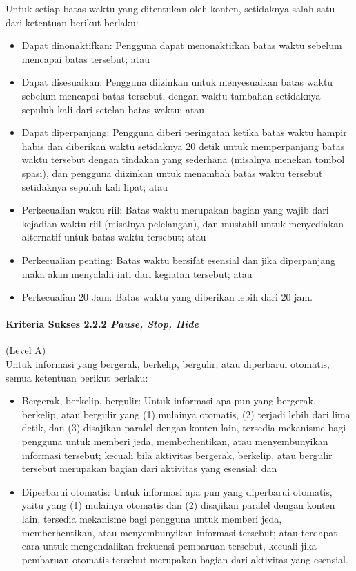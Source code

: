 Untuk setiap batas waktu yang ditentukan oleh konten, setidaknya salah satu dari ketentuan berikut berlaku:
\begin{itemize}
	\item Dapat dinonaktifkan: Pengguna dapat menonaktifkan batas waktu sebelum mencapai batas tersebut; atau
	\item Dapat disesuaikan: Pengguna diizinkan untuk menyesuaikan batas waktu sebelum mencapai batas tersebut, dengan waktu tambahan setidaknya sepuluh kali dari setelan batas waktu; atau
	\item Dapat diperpanjang: Pengguna diberi peringatan ketika batas waktu hampir habis dan diberikan waktu setidaknya 20 detik untuk memperpanjang batas waktu tersebut dengan tindakan yang sederhana (misalnya menekan tombol spasi), dan pengguna diizinkan untuk menambah batas waktu tersebut setidaknya sepuluh kali lipat; atau
	\item Perkecualian waktu riil: Batas waktu merupakan bagian yang wajib dari kejadian waktu riil (misalnya pelelangan), dan mustahil untuk menyediakan alternatif untuk batas waktu tersebut; atau
	\item Perkecualian penting: Batas waktu bersifat esensial dan jika diperpanjang maka akan menyalahi inti dari kegiatan tersebut; atau
	\item Perkecualian 20 Jam: Batas waktu yang diberikan lebih dari 20 jam.
\end{itemize}

\paragraph{Kriteria Sukses 2.2.2 \textit{Pause, Stop, Hide}}
\label{sec:kriteria_sukses_2.2.2}
(Level A)\\

Untuk informasi yang bergerak, berkelip, bergulir, atau diperbarui otomatis, semua ketentuan berikut berlaku:
\begin{itemize}
	\item Bergerak, berkelip, bergulir: Untuk informasi apa pun yang bergerak, berkelip, atau bergulir yang (1) mulainya otomatis, (2) terjadi lebih dari lima detik, dan (3) disajikan paralel dengan konten lain, tersedia mekanisme bagi pengguna untuk memberi jeda, memberhentikan, atau menyembunyikan informasi tersebut; kecuali bila aktivitas bergerak, berkelip, atau bergulir tersebut merupakan bagian dari aktivitas yang esensial; dan
	\item Diperbarui otomatis: Untuk informasi apa pun yang diperbarui otomatis, yaitu yang (1) mulainya otomatis dan (2) disajikan paralel dengan konten lain, tersedia mekanisme bagi pengguna untuk memberi jeda, memberhentikan, atau menyembunyikan informasi tersebut; atau terdapat cara untuk mengendalikan frekuensi pembaruan tersebut, kecuali jika pembaruan otomatis tersebut merupakan bagian dari aktivitas yang esensial.
\end{itemize}

